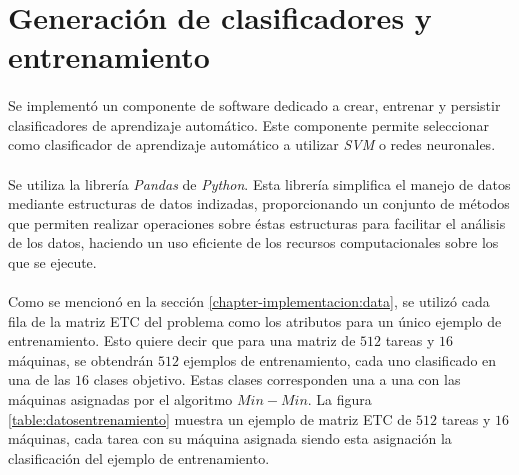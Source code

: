\section{Generación de clasificadores y entrenamiento} \label{chapter-implementacion:clasificadores}

\paragraph{} Se implementó un componente de software dedicado a crear, entrenar y persistir clasificadores de aprendizaje automático. Este componente permite seleccionar como clasificador de aprendizaje automático a utilizar \textit{SVM} o redes neuronales.

\paragraph{} Se utiliza la librería \textit{Pandas}\cite{bib-pandas} de \textit{Python}. Esta librería simplifica el manejo de datos mediante estructuras de datos indizadas, proporcionando un conjunto de métodos que permiten realizar operaciones sobre éstas estructuras para facilitar el análisis de los datos, haciendo un uso eficiente de los recursos computacionales sobre los que se ejecute.

\paragraph{} Como se mencionó en la sección \ref{chapter-implementacion:data}, se utilizó cada fila de la matriz ETC del problema como los atributos para un único ejemplo de entrenamiento. Esto quiere decir que para una matriz de $512$ tareas y $16$ máquinas, se obtendrán $512$ ejemplos de entrenamiento, cada uno clasificado en una de las $16$ clases objetivo. Estas clases corresponden una a una con las máquinas asignadas por el algoritmo $Min-Min$. La figura \ref{table:datosentrenamiento} muestra un ejemplo de matriz ETC de $512$ tareas y $16$ máquinas, cada tarea con su máquina asignada siendo esta asignación la clasificación del ejemplo de entrenamiento.



